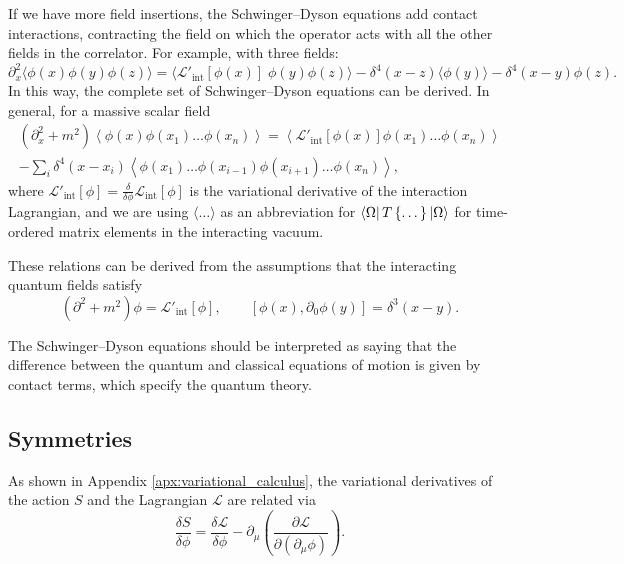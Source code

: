 If we have more field insertions, the Schwinger--Dyson equations add contact interactions, contracting the field on which the operator acts with all the other fields in the correlator. For example, with three fields:
\begin{equation}
  \partial^2_x \langle \phi(x) \phi(y) \phi(z) \rangle = \langle \mathscr{L}'_{\text{int}}[\phi(x)] \; \phi(y) \phi(z) \rangle - \delta^4 (x - z) \langle \phi(y) \rangle - \delta^4 (x - y) \phi(z).
\end{equation}
In this way, the complete set of Schwinger--Dyson equations can be derived. In general, for a massive scalar field \cite[Sec.~14.7]{schwartz}
\begin{multline}
  (\partial^2_x + m^2) \left\langle \phi(x) \phi(x_1) \dots \phi(x_n) \right\rangle = \left\langle \mathscr{L}'_{\text{int}}[\phi(x)] \phi(x_1) \dots \phi(x_n) \right\rangle \\
  - \sum_i \delta^4(x - x_i) \left\langle \phi(x_1) \dots \phi(x_{i-1}) \phi(x_{i+1}) \dots \phi(x_n) \right\rangle,
\end{multline}
where $\mathscr{L}'_{\text{int}}[\phi] = \frac{\delta }{\delta \phi} \mathscr{L}_{\text{int}}[\phi]$ is the variational derivative of the interaction Lagrangian, and we are using $\langle \dots \rangle$ as an abbreviation for $\bra{\Omega} T \left\{ \dots \right\} \ket{\Omega}$ for time-ordered matrix elements in the interacting vacuum.
\begin{leftbar}
  \begin{remark}
    These relations can be derived from the assumptions that the interacting quantum fields satisfy
    \begin{equation}
      (\partial^2 + m^2) \phi = \mathscr{L}'_{\text{int}}[\phi], \qquad [\phi(x), \partial_0 \phi(y)] = \delta^3(x - y).
    \end{equation}
  \end{remark}
\end{leftbar}
The Schwinger--Dyson equations should be interpreted as saying that the difference between the quantum and classical equations of motion is given by contact terms, which specify the quantum theory.

\subsection{Symmetries}%
\label{sub:symmetries}

As shown in Appendix \ref{apx:variational_calculus}, the variational derivatives of the action $S$ and the Lagrangian $\mathscr{L}$ are related via
\begin{equation}
  \frac{\delta S}{\delta \phi} = \frac{\delta \mathscr{L}}{\delta \phi} - \partial_{\mu} \left( \frac{\partial \mathscr{L}}{\partial (\partial_{\mu} \phi)} \right).
\end{equation}

